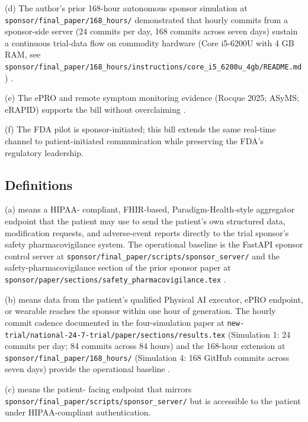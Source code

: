 (d) The author's prior 168-hour autonomous sponsor simulation at
\texttt{sponsor/final\_paper/168\_hours/} demonstrated that hourly
commits from a sponsor-side server (24 commits per day, 168 commits
across seven days) sustain a continuous trial-data flow on
commodity hardware (Core i5-6200U with 4 GB RAM, see
\texttt{sponsor/final\_paper/168\_hours/instructions/core\_i5\_6200u\_4gb/README.md})
\cite{kawchak_2026_19396256}.

(e) The ePRO and remote symptom monitoring evidence (Rocque 2025;
ASyMS; eRAPID) supports the bill without overclaiming
\cite{rocque2025remote_symptom_monitoring, kearney2009asyms,
maguire2017esmart, absolom2021erapid}.

(f) The FDA pilot is sponsor-initiated; this bill extends the same
real-time channel to patient-initiated communication while
preserving the FDA's regulatory leadership.

\subsection{Definitions}

(a)  means a HIPAA-
compliant, FHIR-based, Paradigm-Health-style aggregator endpoint
that the patient may use to send the patient's own structured data,
modification requests, and adverse-event reports directly to the
trial sponsor's safety pharmacovigilance system. The operational
baseline is the FastAPI sponsor control server at
\texttt{sponsor/final\_paper/scripts/sponsor\_server/} and the
safety-pharmacovigilance section of the prior sponsor paper at
\texttt{sponsor/paper/sections/safety\_pharmacovigilance.tex}
\cite{kawchak_2026_19396256}.

(b)  means data from the patient's qualified
Physical AI executor, ePRO endpoint, or wearable reaches the
sponsor within one hour of generation. The hourly commit cadence
documented in the four-simulation paper at
\texttt{new-trial/national-24-7-trial/paper/sections/results.tex}
(Simulation 1: 24 commits per day; 84 commits across 84 hours) and
the 168-hour extension at \texttt{sponsor/final\_paper/168\_hours/}
(Simulation 4: 168 GitHub commits across seven days) provide the
operational baseline \cite{kawchak_2026_19994945,
kawchak_2026_19396256}.

(c)  means the patient-
facing endpoint that mirrors
\texttt{sponsor/final\_paper/scripts/sponsor\_server/} but is
accessible to the patient under HIPAA-compliant authentication.

